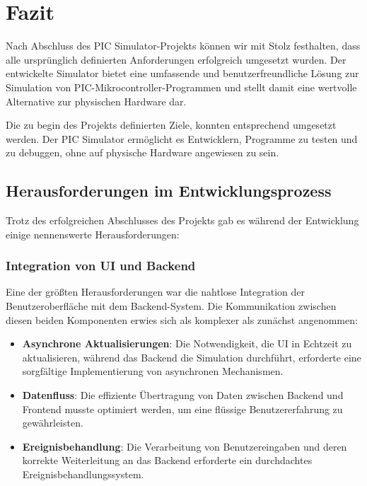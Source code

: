 \chapter{Fazit}

Nach Abschluss des PIC Simulator-Projekts können wir mit Stolz festhalten, dass alle ursprünglich definierten Anforderungen erfolgreich umgesetzt wurden. Der entwickelte Simulator bietet eine umfassende und benutzerfreundliche Lösung zur Simulation von PIC-Mikrocontroller-Programmen und stellt damit eine wertvolle Alternative zur physischen Hardware dar.

Die zu begin des Projekts definierten Ziele, konnten entsprechend umgesetzt werden. Der PIC Simulator ermöglicht es Entwicklern, Programme zu testen und zu debuggen, ohne auf physische Hardware angewiesen zu sein.

\section{Herausforderungen im Entwicklungsprozess}

Trotz des erfolgreichen Abschlusses des Projekts gab es während der Entwicklung einige nennenswerte Herausforderungen:

\subsection{Integration von UI und Backend}

Eine der größten Herausforderungen war die nahtlose Integration der Benutzeroberfläche mit dem Backend-System. Die Kommunikation zwischen diesen beiden Komponenten erwies sich als komplexer als zunächst angenommen:

\begin{itemize}
    \item \textbf{Asynchrone Aktualisierungen}: Die Notwendigkeit, die UI in Echtzeit zu aktualisieren, während das Backend die Simulation durchführt, erforderte eine sorgfältige Implementierung von asynchronen Mechanismen.
    \item \textbf{Datenfluss}: Die effiziente Übertragung von Daten zwischen Backend und Frontend musste optimiert werden, um eine flüssige Benutzererfahrung zu gewährleisten.
    \item \textbf{Ereignisbehandlung}: Die Verarbeitung von Benutzereingaben und deren korrekte Weiterleitung an das Backend erforderte ein durchdachtes Ereignisbehandlungssystem.
\end{itemize}

